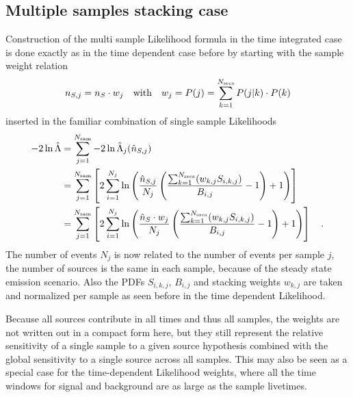 \subsection{Multiple samples stacking case}
Construction of the multi sample Likelihood formula in the time integrated case is done exactly as in the time dependent case before by starting with the sample weight relation
\begin{equation}
  n_{S,j} = n_S \cdot w_j
  \quad\text{with}\quad
  w_j = P(j) = \sum_{k=1}^{N_\text{srcs}} P(j|k)\cdot P(k)
\end{equation}
inserted in the familiar combination of single sample Likelihoods
\begin{align}
  -2\ln\hat{\Lambda}
  &= \sum_{j=1}^{N_\text{sam}} -2\ln\hat{\Lambda}_j(\hat{n}_{S,j}) \\
  &= \sum_{j=1}^{N_\text{sam}} \left[
      2\sum_{i=1}^{N_j} \ln\left(
        \frac{\hat{n}_{S,j}}{N_j}\left(
          \frac{\sum_{k=1}^{N_\text{srcs}}(w_{k,j} S_{i,k,j})}{B_{i,j}} - 1
        \right) + 1
      \right)
    \right] \\
  &= \sum_{j=1}^{N_\text{sam}} \left[
      2\sum_{i=1}^{N_j} \ln\left(
        \frac{\hat{n}_S \cdot w_j}{N_j}\left(
          \frac{\sum_{k=1}^{N_\text{srcs}}(w_{k,j} S_{i,k,j})}{B_{i,j}} - 1
        \right) + 1
      \right)
    \right]
  \quad\text{.}
\end{align}
The number of events $N_j$ is now related to the number of events per sample $j$, the number of sources is the same in each sample, because of the steady state emission scenario.
Also the PDFs $S_{i,k,j}$, $B_{i,j}$ and stacking weights $w_{k,j}$ are taken and normalized per sample as seen before in the time dependent Likelihood.

Because all sources contribute in all times and thus all samples, the weights are not written out in a compact form here, but they still represent the relative sensitivity of a single sample to a given source hypothesis combined with the global sensitivity to a single source across all samples.
This may also be seen as a special case for the time-dependent Likelihood weights, where all the time windows for signal and background are as large as the sample livetimes.

